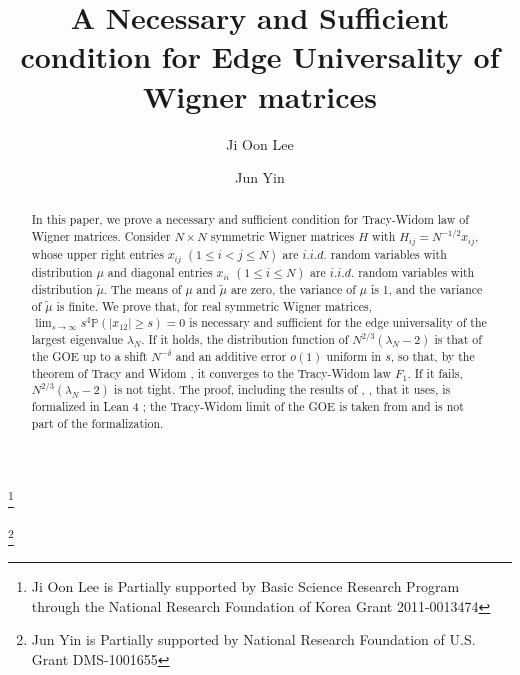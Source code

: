 \documentclass[reqno, 10pt]{amsart}
\theoremstyle{definition}
\theoremstyle{remark}
\newcommand{\p}{\mathbb{P}}
\numberwithin{equation}{section}
\numberwithin{thm}{section}
\newcommand{\wt}{\widetilde}
\begin{document}
\title{A Necessary and Sufficient condition for Edge Universality of Wigner matrices}

\author{Ji Oon Lee}
\address{Department of Mathematical Sciences\\
Korea Advanced Institute of Science and Technology\\
Daejeon, 305701, Republic of Korea}
\thanks{Ji Oon Lee is Partially supported by Basic Science Research Program through the National Research Foundation of Korea Grant  2011-0013474}

\author{Jun Yin}
\address{Department of Mathematics\\
University of Wisconsin-Madison\\
480 Lincoln Dr., Madison\\
WI 53706, USA}
\thanks{Jun Yin  is Partially supported by  National Research Foundation of U.S.  Grant  DMS-1001655}



  
\begin{abstract}

In this paper, we prove a necessary and sufficient condition for Tracy-Widom law of Wigner matrices. Consider $N \times N$ symmetric Wigner matrices $H$ with $H_{ij} = N^{-1/2} x_{ij}$, whose upper right entries $x_{ij}$ $(1\le i< j\le N)$ are $i.i.d.$ random variables with distribution $\mu$ and diagonal entries $x_{ii}$ $(1\le i\le N)$ are $i.i.d.$ random variables with distribution $\wt \mu$. The means of $\mu$ and $\wt \mu$ are zero, the variance of $\mu$ is 1, and the variance of $\wt \mu $ is finite. We prove that, for real symmetric Wigner matrices, $\lim_{s\to \infty}s^4\p(|x_{12}| \ge s)=0$ is necessary and sufficient for the edge universality of the largest eigenvalue $\lambda_N$. If it holds, the distribution function of $N^{2/3}(\lambda_N-2)$ is that of the GOE up to a shift $N^{-\delta}$ and an additive error $o(1)$ uniform in $s$, so that, by the theorem of Tracy and Widom \cite{TR1, TR2}, it converges to the Tracy-Widom law $F_1$. If it fails, $N^{2/3}(\lambda_N-2)$ is not tight. The proof, including the results of \cite{EKYY1}, \cite{EKYY2}, \cite{EYY} that it uses, is formalized in Lean 4 \cite{Lean}; the Tracy-Widom limit of the GOE is taken from \cite{TR1, TR2} and is not part of the formalization.
\end{abstract}
\end{document}
